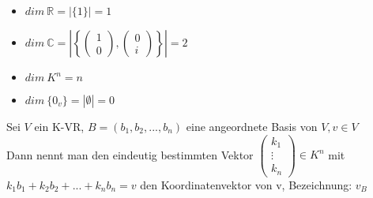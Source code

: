 \documentclass{../tudscript}
\begin{document}
\hypertarget{beispiel-5}{%
\label{beispiel-5}}

\begin{itemize}
\tightlist
\item
  \(dim\>\mathbb{R}= |\{1\}| = 1\)
\item
  \(dim\>\mathbb{C} = \left|\left\{\begin{pmatrix}1\\0\end{pmatrix}, \begin{pmatrix}0\\i\end{pmatrix}\right\}\right| = 2\)
\item
  \(dim\>K^n = n\)
\item
  \(dim\>\{0_v\} = |\emptyset| = 0\)
\end{itemize}

\hypertarget{definition-4}{%
\label{definition-4}}

Sei \(V\) ein K-VR, \(B=(b_1, b_2, ..., b_n)\) eine angeordnete Basis
von \(V, v \in V\)\\
Dann nennt man den eindeutig bestimmten Vektor
\(\begin{pmatrix}k_1\\\vdots\\k_n\end{pmatrix} \in K^n\) mit
\(k_1b_1 + k_2b_2+...+k_nb_n = v\) den Koordinatenvektor von v,
Bezeichnung: \(v_B\)
\end{document}
